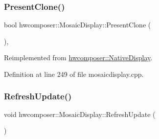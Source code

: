 \mbox{\label{classhwcomposer_1_1MosaicDisplay_a989d240e0d3287ec2b9e6cfbe1041bda}} 
\subsubsection{\texorpdfstring{Present\+Clone()}{PresentClone()}}
{\footnotesize\ttfamily bool hwcomposer\+::\+Mosaic\+Display\+::\+Present\+Clone (\begin{DoxyParamCaption}\item[{\mbox{\hyperlink{classhwcomposer_1_1NativeDisplay}{Native\+Display}} $\ast$}]{ }\end{DoxyParamCaption})\hspace{0.3cm}{\ttfamily [override]}, {\ttfamily [virtual]}}



Reimplemented from \mbox{\hyperlink{classhwcomposer_1_1NativeDisplay_ae031f7f90f8a4ab3fba24a31c4cc6b74}{hwcomposer\+::\+Native\+Display}}.



Definition at line 249 of file mosaicdisplay.\+cpp.


\begin{DoxyCode}{0}
\end{DoxyCode}
\mbox{\label{classhwcomposer_1_1MosaicDisplay_aeb0d37462e1584fa329deaea3d7788e3}} 
\subsubsection{\texorpdfstring{Refresh\+Update()}{RefreshUpdate()}}
{\footnotesize\ttfamily void hwcomposer\+::\+Mosaic\+Display\+::\+Refresh\+Update (\begin{DoxyParamCaption}{ }\end{DoxyParamCaption})}




